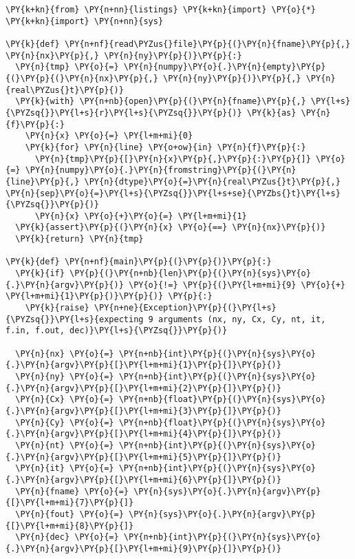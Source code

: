 \begin{Verbatim}[commandchars=\\\{\}]
\PY{k+kn}{from} \PY{n+nn}{listings} \PY{k+kn}{import} \PY{o}{*}
\PY{k+kn}{import} \PY{n+nn}{sys}

\PY{k}{def} \PY{n+nf}{read\PYZus{}file}\PY{p}{(}\PY{n}{fname}\PY{p}{,} \PY{n}{nx}\PY{p}{,} \PY{n}{ny}\PY{p}{)}\PY{p}{:}
  \PY{n}{tmp} \PY{o}{=} \PY{n}{numpy}\PY{o}{.}\PY{n}{empty}\PY{p}{(}\PY{p}{(}\PY{n}{nx}\PY{p}{,} \PY{n}{ny}\PY{p}{)}\PY{p}{,} \PY{n}{real\PYZus{}t}\PY{p}{)}
  \PY{k}{with} \PY{n+nb}{open}\PY{p}{(}\PY{n}{fname}\PY{p}{,} \PY{l+s}{\PYZsq{}}\PY{l+s}{r}\PY{l+s}{\PYZsq{}}\PY{p}{)} \PY{k}{as} \PY{n}{f}\PY{p}{:}
    \PY{n}{x} \PY{o}{=} \PY{l+m+mi}{0}
    \PY{k}{for} \PY{n}{line} \PY{o+ow}{in} \PY{n}{f}\PY{p}{:}
      \PY{n}{tmp}\PY{p}{[}\PY{n}{x}\PY{p}{,}\PY{p}{:}\PY{p}{]} \PY{o}{=} \PY{n}{numpy}\PY{o}{.}\PY{n}{fromstring}\PY{p}{(}\PY{n}{line}\PY{p}{,} \PY{n}{dtype}\PY{o}{=}\PY{n}{real\PYZus{}t}\PY{p}{,} \PY{n}{sep}\PY{o}{=}\PY{l+s}{\PYZsq{}}\PY{l+s+se}{\PYZbs{}t}\PY{l+s}{\PYZsq{}}\PY{p}{)}
      \PY{n}{x} \PY{o}{+}\PY{o}{=} \PY{l+m+mi}{1}
  \PY{k}{assert}\PY{p}{(}\PY{n}{x} \PY{o}{==} \PY{n}{nx}\PY{p}{)}
  \PY{k}{return} \PY{n}{tmp}

\PY{k}{def} \PY{n+nf}{main}\PY{p}{(}\PY{p}{)}\PY{p}{:}
  \PY{k}{if} \PY{p}{(}\PY{n+nb}{len}\PY{p}{(}\PY{n}{sys}\PY{o}{.}\PY{n}{argv}\PY{p}{)} \PY{o}{!=} \PY{p}{(}\PY{l+m+mi}{9} \PY{o}{+} \PY{l+m+mi}{1}\PY{p}{)}\PY{p}{)} \PY{p}{:} 
    \PY{k}{raise} \PY{n+ne}{Exception}\PY{p}{(}\PY{l+s}{\PYZsq{}}\PY{l+s}{expecting 9 arguments (nx, ny, Cx, Cy, nt, it, f.in, f.out, dec)}\PY{l+s}{\PYZsq{}}\PY{p}{)}

  \PY{n}{nx} \PY{o}{=} \PY{n+nb}{int}\PY{p}{(}\PY{n}{sys}\PY{o}{.}\PY{n}{argv}\PY{p}{[}\PY{l+m+mi}{1}\PY{p}{]}\PY{p}{)}
  \PY{n}{ny} \PY{o}{=} \PY{n+nb}{int}\PY{p}{(}\PY{n}{sys}\PY{o}{.}\PY{n}{argv}\PY{p}{[}\PY{l+m+mi}{2}\PY{p}{]}\PY{p}{)}
  \PY{n}{Cx} \PY{o}{=} \PY{n+nb}{float}\PY{p}{(}\PY{n}{sys}\PY{o}{.}\PY{n}{argv}\PY{p}{[}\PY{l+m+mi}{3}\PY{p}{]}\PY{p}{)}
  \PY{n}{Cy} \PY{o}{=} \PY{n+nb}{float}\PY{p}{(}\PY{n}{sys}\PY{o}{.}\PY{n}{argv}\PY{p}{[}\PY{l+m+mi}{4}\PY{p}{]}\PY{p}{)}
  \PY{n}{nt} \PY{o}{=} \PY{n+nb}{int}\PY{p}{(}\PY{n}{sys}\PY{o}{.}\PY{n}{argv}\PY{p}{[}\PY{l+m+mi}{5}\PY{p}{]}\PY{p}{)}
  \PY{n}{it} \PY{o}{=} \PY{n+nb}{int}\PY{p}{(}\PY{n}{sys}\PY{o}{.}\PY{n}{argv}\PY{p}{[}\PY{l+m+mi}{6}\PY{p}{]}\PY{p}{)}
  \PY{n}{fname} \PY{o}{=} \PY{n}{sys}\PY{o}{.}\PY{n}{argv}\PY{p}{[}\PY{l+m+mi}{7}\PY{p}{]}
  \PY{n}{fout} \PY{o}{=} \PY{n}{sys}\PY{o}{.}\PY{n}{argv}\PY{p}{[}\PY{l+m+mi}{8}\PY{p}{]}
  \PY{n}{dec} \PY{o}{=} \PY{n+nb}{int}\PY{p}{(}\PY{n}{sys}\PY{o}{.}\PY{n}{argv}\PY{p}{[}\PY{l+m+mi}{9}\PY{p}{]}\PY{p}{)}


\end{Verbatim}
